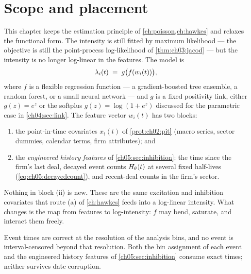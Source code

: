 
\section{Scope and placement}\label{chnp:sec:scope}

This chapter keeps the estimation principle of
\cref{ch:poisson,ch:hawkes} and relaxes the functional form. The
intensity is still fitted by maximum likelihood --- the objective is
still the point-process log-likelihood of \cref{thm:ch03:jacod} --- but
the intensity is no longer log-linear in the features. The model is
\begin{equation}\label{eq:chnp:model}
\lambda_i(t) \;=\; g\big(f(w_i(t))\big),
\end{equation}
where $f$ is a flexible regression function --- a gradient-boosted tree
ensemble, a random forest, or a small neural network --- and $g$ is a
fixed positivity link, either $g(z) = e^{z}$ or the softplus
$g(z) = \log(1 + e^{z})$ discussed for the parametric case in
\cref{ch04:sec:link}. The feature vector $w_i(t)$ has two blocks:
\begin{enumerate}[label=(\roman*)]
\item the point-in-time covariates $x_i(t)$ of \cref{prot:ch02:pit}
(macro series, sector dummies, calendar terms, firm attributes); and
\item the \emph{engineered history features} of
\cref{ch05:sec:inhibition}: the time since the firm's last deal, decayed
event counts $H_{\theta}(t)$ at several fixed half-lives
(\cref{eq:ch05:decayedcount}), and recent-deal counts in the firm's
sector.
\end{enumerate}
Nothing in block (ii) is new. These are the same excitation and
inhibition covariates that route (a) of \cref{ch:hawkes} feeds into a
log-linear intensity. What changes is the map from features to
log-intensity: $f$ may bend, saturate, and interact them freely.

\begin{assumption}\label{asm:chnp:trusted}
Event times are correct at the resolution of the analysis bins, and no
event is interval-censored beyond that resolution. Both the bin
assignment of each event and the engineered history features of
\cref{ch05:sec:inhibition} consume exact times; neither survives date
corruption.
\end{assumption}

